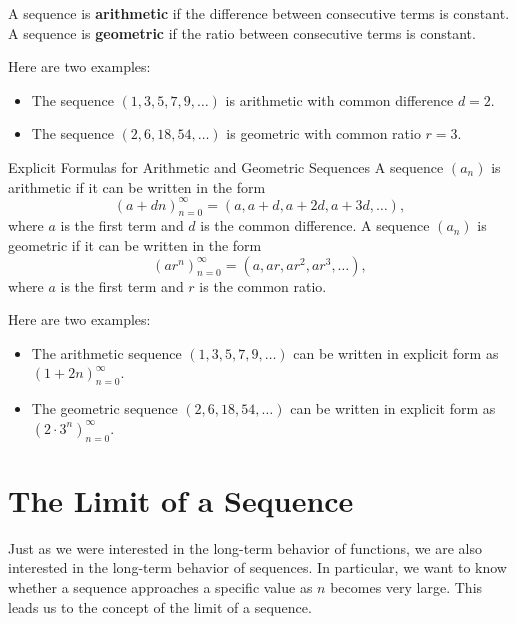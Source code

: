 \documentclass{article}
\begin{document}
\begin{definition}\label{def:arithmetic-geometric-sequence}
A sequence is \textbf{arithmetic} if the difference between consecutive terms is constant. A sequence is \textbf{geometric} if the ratio between consecutive terms is constant.
\end{definition}

\begin{example}\label{ex:arithmetic-geometric-example}
Here are two examples:
\begin{itemize}
    \item The sequence \((1, 3, 5, 7, 9, \ldots)\) is arithmetic with common difference \(d = 2\).
    \item The sequence \((2, 6, 18, 54, \ldots)\) is geometric with common ratio \(r = 3\).
\end{itemize}
\end{example}

\begin{calloutbox}{Explicit Formulas for Arithmetic and Geometric Sequences}\label{box:arithmetic-geometric-formulas}\linebreak
A sequence \((a_n)\) is arithmetic if it can be written in the form
\[(a+dn)_{n=0}^\infty = (a, a+d, a+2d, a+3d, \ldots),\]
where \(a\) is the first term and \(d\) is the common difference. A sequence \((a_n)\) is geometric if it can be written in the form
\[(ar^n)_{n=0}^\infty = (a, ar, ar^2, ar^3, \ldots),\]
where \(a\) is the first term and \(r\) is the common ratio.
\end{calloutbox}

\begin{example}\label{ex:arithmetic-geometric-formulas}
Here are two examples:
\begin{itemize}
    \item The arithmetic sequence \((1, 3, 5, 7, 9, \ldots)\) can be written in explicit form as \((1+2n)_{n=0}^\infty\).
    \item The geometric sequence \((2, 6, 18, 54, \ldots)\) can be written in explicit form as \((2 \cdot 3^n)_{n=0}^\infty\).
\end{itemize}
\end{example}

\section{The Limit of a Sequence}\label{sec:limit-sequence}

Just as we were interested in the long-term behavior of functions, we are also interested in the long-term behavior of sequences. In particular, we want to know whether a sequence approaches a specific value as \(n\) becomes very large. This leads us to the concept of the limit of a sequence.
\end{document}
